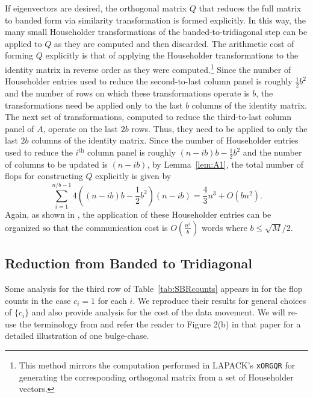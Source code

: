 \documentclass{article}
\def\lt{\left}
\def\rt{\right}
\theoremstyle{definition}
\begin{document}
If eigenvectors are desired, the orthogonal matrix $Q$ that reduces the full matrix to banded form via similarity transformation is formed explicitly.  In this way, the many small Householder transformations of the banded-to-tridiagonal step can be applied to $Q$ as they are computed and then discarded.  The arithmetic cost of forming $Q$ explicitly is that of applying the Householder transformations to the identity matrix in reverse order as they were computed.\footnote{This method mirrors the computation performed in LAPACK's {\tt xORGQR} for generating the corresponding orthogonal matrix from a set of Householder vectors.}  Since the number of Householder entries used to reduce the second-to-last column panel is roughly $\frac12 b^2$ and the number of rows on which these transformations operate is $b$, the transformations need be applied only to the last $b$ columns of the identity matrix.  The next set of transformations, computed to reduce the third-to-last column panel of $A$, operate on the last $2b$ rows.  Thus, they need to be applied to only the last $2b$ columns of the identity matrix.   Since the number of Householder entries used to reduce the $i^\text{th}$ column panel is roughly $(n-ib)b-\frac12 b^2$ and the number of columns to be updated is $(n-ib)$, by Lemma~\ref{lem:A1}, the total number of flops for constructing $Q$ explicitly is given by
$$\sum_{i=1}^{n/b-1}4\lt((n-ib)b-\frac12 b^2\rt)(n-ib) = \frac43n^3 + O(bn^2).$$
Again, as shown in \cite{DGHL08}, the application of these Householder entries can be organized so that the communication cost is $O\lt(\frac{n^3}{b}\rt)$ words where $b\leq\sqrt M/2$.

\subsection{Reduction from Banded to Tridiagonal}

Some analysis for the third row of Table~\ref{tab:SBRcounts} appears in \cite{SBR1} for the flop counts in the case $c_i=1$ for each $i$.  We reproduce their results for general choices of $\{c_i\}$ and also provide analysis for the cost of the data movement.  We will re-use the terminology from \cite{SBR1} and refer the reader to Figure 2(b) in that paper for a detailed illustration of one bulge-chase.
\end{document}

